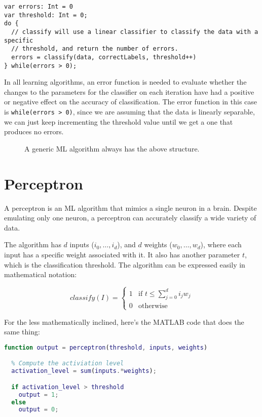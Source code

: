 \begin{lstlisting}[label=linearClassifierLearningAlgorithm, caption=Linear classifier learning algorithm]
var errors: Int = 0
var threshold: Int = 0;
do {
  // classify will use a linear classifier to classify the data with a specific
  // threshold, and return the number of errors.
  errors = classify(data, correctLabels, threshold++)
} while(errors > 0);
\end{lstlisting}

In all learning algorithms, an error function is needed to evaluate whether the
changes to the parameters for the classifier on each iteration have had a
positive or negative effect on the accuracy of classification. The error
function in this case is \texttt{while(errors > 0)}, since we are assuming that
the data is linearly separable, we can just keep incrementing the threshold
value until we get a one that produces no errors.

\begin{figure}[!h]
  
  \caption{A generic ML algorithm always has the above structure.}
  \label{fig:generic-ML-algorithm}
\end{figure}

\section{Perceptron}

A perceptron is an ML algorithm that mimics a single neuron in a brain. Despite
emulating only one neuron, a perceptron can accurately classify a wide variety of
data.

The algorithm has $d$ inputs ($i_0, \dots, i_d$), and $d$ weights ($w_0, \dots,
w_d$), where each input has a specific weight associated with it. It also has
another parameter $t$, which is the classification threshold. The algorithm can
be expressed easily in mathematical notation:

\[
  classify(I) = 
  \begin{cases}
    1 & \text{if } t \leq \sum\limits^d_{j=0}i_jw_j\\
    0 & \text{otherwise}
  \end{cases}
\]

For the less mathematically inclined, here's the MATLAB code that does the same
thing:

\begin{lstlisting}[language=matlab, label=perceptron,
                   caption=A perceptron implementation in MATLAB]
  function output = perceptron(threshold, inputs, weights)

  % Compute the activiation level
  activation_level = sum(inputs.*weights);

  if activation_level > threshold
    output = 1;
  else
    output = 0;
\end{lstlisting}

